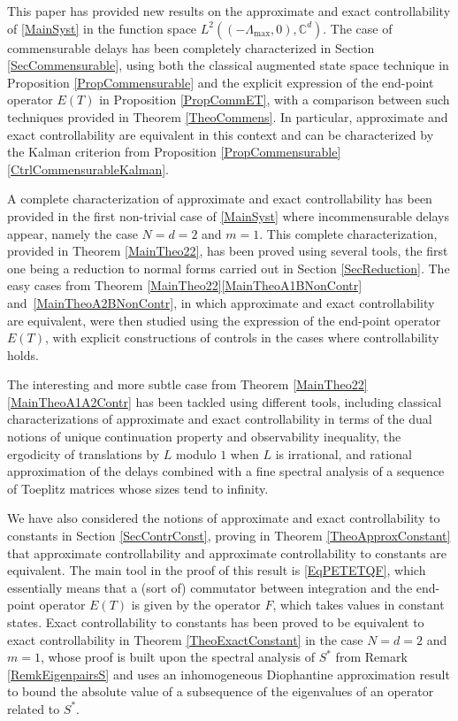 \documentclass[10pt]{article}
\theoremstyle{plain}
\theoremstyle{definition}
\numberwithin{equation}{section}\numberwithin{figure}{section}\emergencystretch=3em
\begin{document}
This paper has provided new results on the approximate and exact controllability of \eqref{MainSyst} in the function space $L^2((-\Lambda_{\max}, 0), \mathbb C^d)$. The case of commensurable delays has been completely characterized in Section \ref{SecCommensurable}, using both the classical augmented state space technique in Proposition \ref{PropCommensurable} and the explicit expression of the end-point operator $E(T)$ in Proposition \ref{PropCommET}, with a comparison between such techniques provided in Theorem \ref{TheoCommens}. In particular, approximate and exact controllability are equivalent in this context and can be characterized by the Kalman criterion from Proposition \ref{PropCommensurable}\eqref{CtrlCommensurableKalman}.

A complete characterization of approximate and exact controllability has been provided in the first non-trivial case of \eqref{MainSyst} where incommensurable delays appear, namely the case $N = d = 2$ and $m = 1$. This complete characterization, provided in Theorem \ref{MainTheo22}, has been proved using several tools, the first one being a reduction to normal forms carried out in Section \ref{SecReduction}. The easy cases from Theorem \ref{MainTheo22}\eqref{MainTheoA1BNonContr} and~\eqref{MainTheoA2BNonContr}, in which approximate and exact controllability are equivalent, were then studied using the expression of the end-point operator $E(T)$, with explicit constructions of controls in the cases where controllability holds.

The interesting and more subtle case from Theorem \ref{MainTheo22}\eqref{MainTheoA1A2Contr} has been tackled using different tools, including classical characterizations of approximate and exact controllability in terms of the dual notions of unique continuation property and observability inequality, the ergodicity of translations by $L$ modulo $1$ when $L$ is irrational, and rational approximation of the delays combined with a fine spectral analysis of a sequence of Toeplitz matrices whose sizes tend to infinity.

We have also considered the notions of approximate and exact controllability to constants in Section \ref{SecContrConst}, proving in Theorem \ref{TheoApproxConstant} that approximate controllability and approximate controllability to constants are equivalent. The main tool in the proof of this result is \eqref{EqPETETQF}, which essentially means that a (sort of) commutator between integration and the end-point operator $E(T)$ is given by the operator $F$, which takes values in constant states. Exact controllability to constants has been proved to be equivalent to exact controllability in Theorem \ref{TheoExactConstant} in the case $N = d = 2$ and $m = 1$, whose proof is built upon the spectral analysis of $S^\ast$ from Remark \ref{RemkEigenpairsS} and uses an inhomogeneous Diophantine approximation result to bound the absolute value of a subsequence of the eigenvalues of an operator related to $S^\ast$.
\end{document}
